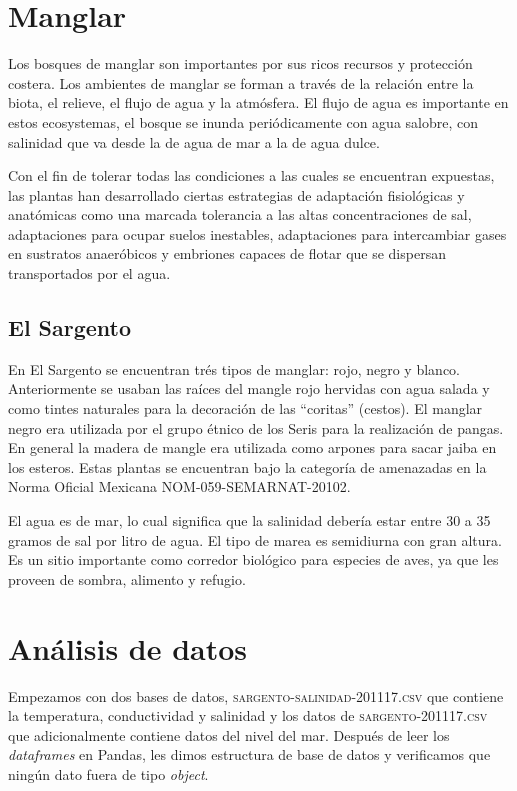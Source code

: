 \documentclass[12pt]{article}
\begin{document}
\section{Manglar}
\noindent
Los bosques de manglar son importantes por sus ricos recursos y protecci\'on costera. Los ambientes de manglar se forman a trav\'es de la relaci\'on entre la biota, el relieve, el flujo de agua y la atmósfera. El flujo de agua es importante en estos ecosystemas, el bosque se inunda periódicamente con agua salobre, con salinidad que va desde la de agua de mar a la de agua dulce.

Con el fin de tolerar todas las condiciones a las cuales se encuentran expuestas, las plantas han desarrollado ciertas estrategias de adaptación fisiológicas y anatómicas como una marcada tolerancia a las altas concentraciones de sal, adaptaciones para ocupar suelos inestables, adaptaciones para intercambiar gases en sustratos anaeróbicos y embriones capaces de flotar que se dispersan transportados por el agua.
\subsection{El Sargento} 
En El Sargento se encuentran tr\'es tipos de manglar: rojo, negro y blanco. Anteriormente se usaban las raíces del mangle rojo hervidas con agua salada y como tintes
naturales para la decoración de las “coritas” (cestos). El manglar negro era utilizada por el grupo étnico de los Seris para la realización de pangas. En general la madera de mangle era utilizada como arpones para sacar jaiba en los esteros. Estas plantas se encuentran bajo la categoría de amenazadas en la Norma Oficial Mexicana \textsc{NOM-059-SEMARNAT-20102}.

El agua es de mar, lo cual significa que la salinidad deber\'ia estar entre 30 a 35 gramos de sal por litro de agua. El tipo de marea es semidiurna con gran altura. Es un sitio importante como corredor biológico para especies de aves, ya que les proveen de sombra, alimento
y refugio.

\section{An\'alisis de datos}
\noindent
Empezamos con dos bases de datos, \textsc{sargento-salinidad-201117.csv} que contiene la temperatura, conductividad y salinidad y los datos de \textsc{sargento-201117.csv} que adicionalmente contiene datos del nivel del mar. Despu\'es de leer los \emph{dataframes} en Pandas, les dimos estructura de base de datos y verificamos que ning\'un dato fuera de tipo \emph{object}.
\end{document}
